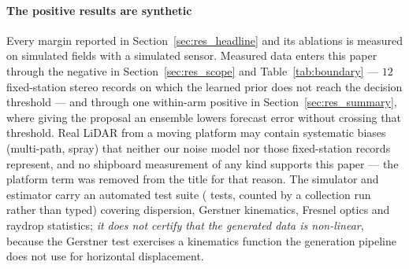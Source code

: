 \documentclass[review]{elsarticle}
\begin{document}
\paragraph{The positive results are synthetic}
Every margin reported in
Section~\ref{sec:res_headline} and its ablations is measured on simulated fields
with a simulated sensor. Measured data enters this paper through the negative
in Section~\ref{sec:res_scope} and Table~\ref{tab:boundary} --- $12$ fixed-station
stereo records on which the learned prior does not reach the decision threshold ---
and through one within-arm positive in Section~\ref{sec:res_summary}, where giving
the proposal an ensemble lowers forecast error without crossing that threshold.
Real LiDAR from a moving
platform may contain systematic biases (multi-path, spray) that neither our noise
model nor those fixed-station records represent, and no shipboard measurement of
any kind supports this paper --- the platform term was removed from the title for
that reason.
The simulator and estimator carry an automated test suite
(\DeployNumTestsPaper{} tests, counted by a collection run rather than typed)
covering dispersion, Gerstner kinematics, Fresnel optics and raydrop statistics;
\emph{it does not certify that the generated data is non-linear}, because the
Gerstner test exercises a kinematics function the generation pipeline does not use
for horizontal displacement.
\end{document}

